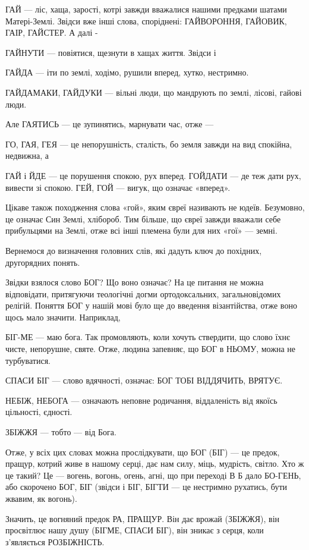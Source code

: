 ГАЙ — ліс, хаща, зарості, котрі завжди вважалися нашими предками шатами
Матері-Землі. Звідси вже інші слова, споріднені: ГАЙВОРОННЯ, ГАЙОВИК, ГАІР,
ГАЙСТЕР. А далі -

ГАЙНУТИ — повіятися, щезнути в хащах життя. Звідси і

ГАЙДА — іти по землі, ходімо, рушили вперед, хутко, нестримно.

ГАЙДАМАКИ, ГАЙДУКИ — вільні люди, що мандрують по землі, лісові, гайові люди.

Але ГАЯТИСЬ — це зупинятись, марнувати час, отже —

ГО, ГАЯ, ГЕЯ — це непорушність, сталість, бо земля завжди на вид спокійна,
недвижна, а

ГАЙ і ЙДЕ — це порушення спокою, рух вперед. ГОЙДАТИ — де теж дати рух, вивести
зі спокою. ГЕЙ, ГОЙ — вигук, що означає «вперед».

Цікаве також походження слова «гой», яким євреї називають не юдеїв. Безумовно,
це означає Син Землі, хлібороб. Тим більше, що євреї завжди вважали себе
прибульцями на Землі, отже всі інші племена були для них «гої» — земні.

Вернемося до визначення головних слів, які дадуть ключ до похідних, другорядних
понять.

Звідки взялося слово БОГ? Що воно означає? На це питання не можна відповідати,
притягуючи теологічні догми ортодоксальних, загальновідомих релігій. Поняття
БОГ у нашій мові було ще до введення візантійства, отже воно щось мало значити.
Наприклад,

БІГ-МЕ — маю бога. Так промовляють, коли хочуть ствердити, що слово їхнє чисте,
непорушне, святе. Отже, людина запевняє, що БОГ в НЬОМУ, можна не турбуватися.

СПАСИ БІГ — слово вдячності, означає: БОГ ТОБІ ВІДДЯЧИТЬ, ВРЯТУЄ.

НЕБІЖ, НЕБОГА — означають неповне родичання, віддаленість від якоїсь цільності,
єдності.

ЗБІЖЖЯ — тобто — від Бога.

Отже, у всіх цих словах можна прослідкувати, що БОГ (БІГ) — це предок, пращур,
котрий живе в нашому серці, дає нам силу, міць, мудрість, світло. Хто ж це
такий? Це — вогень, вогонь, огень, агні, що при переході В Б дало БО-ГЕНЬ, або
скорочено БОГ, БІГ (звідси і БІГ, БІГТИ — це нестримно рухатись, бути жвавим,
як вогонь).

Значить, це вогняний предок РА, ПРАЩУР. Він дає врожай (ЗБІЖЖЯ), він просвітлює
нашу душу (БІГМЕ, СПАСИ БІГ), він зникає з серця, коли з’являється РОЗБІЖНІСТЬ.

